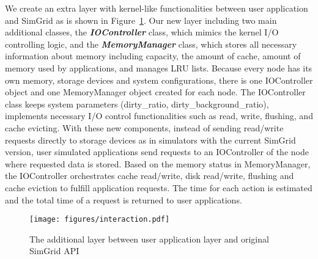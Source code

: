 \documentclass[conference]{IEEEtran}
\begin{document}
			We create an extra layer with kernel-like functionalities between user application and SimGrid as is shown in Figure~\ref{fig:interaction}. Our new layer including two main additional classes, the \textbf{\textit{IOController}} class, which mimics the kernel I/O controlling logic, and the \textbf{\textit{MemoryManager}} class, which stores all necessary information about memory including capacity, the amount of cache, amount of memory used by applications, and manages LRU lists. Because every node has its own memory, storage devices and system configurations, there is one IOController object and one MemoryManager object created for each node. The IOController class keeps system parameters (dirty{\_}ratio, dirty{\_}background{\_}ratio), implements necessary I/O control functionalities such as read, write, flushing, and cache evicting. With these new components, instead of sending read/write requests directly to storage devices as in simulators with the current SimGrid version, user simulated applications send requests to an IOController of the node where requested data is stored. Based on the memory status in MemoryManager, the IOController orchestrates cache read/write, disk read/write, flushing and cache eviction to fulfill application requests. The time for each action is estimated and the total time of a request is returned to user applications.
				
			\begin{figure}
   				\centering
   				\texttt{[image: figures/interaction.pdf]}
   				\caption{The additional layer between user application layer and original SimGrid API}\label{fig:interaction}
			\end{figure}
			
\end{document}
